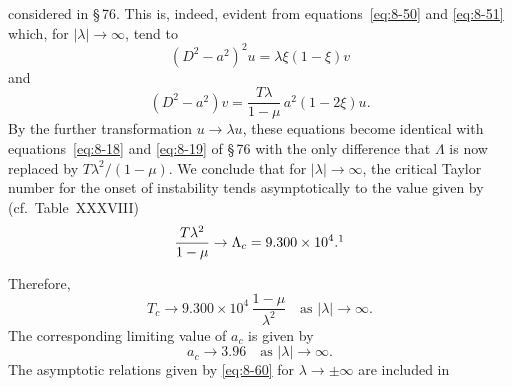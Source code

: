 

considered in \S\,76. This is, indeed, evident from equations~\eqref{eq:8-50} and \eqref{eq:8-51} which, for $|\lambda|\to\infty$, tend to
\begin{equation}
\label{eq:8-57}
(D^2 - a^2)^2 u = \lambda\xi(1-\xi)v
\end{equation}
and
\begin{equation}
\label{eq:8-58}
(D^2 - a^2)v = \frac{T\lambda}{1-\mu}\,a^2(1-2\xi)u.
\end{equation}
By the further transformation $u \to \lambda u$, these equations become identical with equations~\eqref{eq:8-18} and \eqref{eq:8-19} of \S\,76 with the only difference that $\Lambda$ is now replaced by $T\lambda^2/(1-\mu)$. We conclude that for $|\lambda|\to\infty$, the critical Taylor number for the onset of instability tends asymptotically to the value given by (cf.\ Table~XXXVIII)
\begin{equation}
\label{eq:8-59}
\frac{T\lambda^2}{1-\mu} \to \Lambda_c = 9.300\times 10^4.\footnotemark
\end{equation}

Therefore,
\begin{equation}
\label{eq:8-60}
T_c \to 9.300 \times 10^4\,\frac{1-\mu}{\lambda^2} \quad \text{as } |\lambda| \to \infty.
\end{equation}
The corresponding limiting value of $a_c$ is given by
\begin{equation}
\label{eq:8-61}
a_c \to 3.96 \quad \text{as } |\lambda| \to \infty.
\end{equation}
The asymptotic relations given by \eqref{eq:8-60} for $\lambda \to \pm\infty$ are included in


